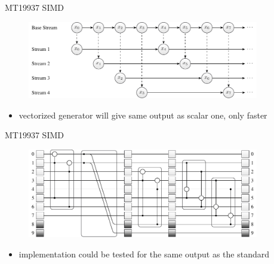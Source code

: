\documentclass[aspectratio=169]{beamer}
\begin{document}
    \begin{frame}{MT19937 SIMD}
      \begin{figure}
        \includegraphics[width=0.9\textwidth]{figures/leapfrogging_multiple_streams.pdf}
      \end{figure}
      \begin{itemize}
        \item vectorized generator will give same output as scalar one, only faster
      \end{itemize}
    \end{frame}

    \begin{frame}{MT19937 SIMD}
      \begin{figure}
        \includegraphics[width=0.9\textwidth]{figures/mt19937_vector_loop_scheme.pdf}
      \end{figure}
      \begin{itemize}
        \item implementation could be tested for the same output as the standard
      \end{itemize}
    \end{frame}
\end{document}
